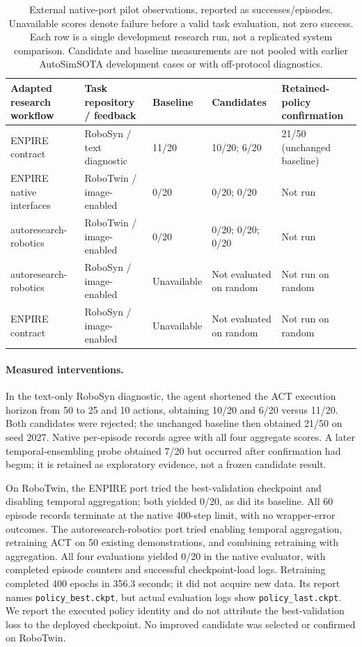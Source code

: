 \documentclass[10pt,twocolumn,letterpaper]{article}
\begin{document}
\begin{table}[t]
\centering\small
\begin{tabular}{@{}lllll@{}}
\toprule
Adapted research workflow & Task repository / feedback & Baseline & Candidates & Retained-policy confirmation \\
\midrule
ENPIRE contract & RoboSyn / text diagnostic & 11/20 & 10/20; 6/20 & 21/50 (unchanged baseline) \\
ENPIRE native interfaces & RoboTwin / image-enabled & 0/20 & 0/20; 0/20 & Not run \\
autoresearch-robotics & RoboTwin / image-enabled & 0/20 & 0/20; 0/20; 0/20 & Not run \\
autoresearch-robotics & RoboSyn / image-enabled & Unavailable & Not evaluated on random & Not run on random \\
ENPIRE contract & RoboSyn / image-enabled & Unavailable & Not evaluated on random & Not run on random \\
\bottomrule
\end{tabular}
\caption{External native-port pilot observations, reported as successes/episodes.
Unavailable scores denote failure before a valid task evaluation, not zero
success. Each row is a single development research run, not a replicated system
comparison. Candidate and baseline measurements are not pooled with earlier
AutoSimSOTA development cases or with off-protocol diagnostics.}
\label{tab:external-native-pilots}
\end{table}

\paragraph{Measured interventions.}
In the text-only RoboSyn diagnostic, the agent shortened the ACT execution
horizon from 50 to 25 and 10 actions, obtaining 10/20 and 6/20 versus 11/20.
Both candidates were rejected; the unchanged baseline then obtained 21/50 on
seed 2027. Native per-episode records agree with all four aggregate scores.
A later temporal-ensembling probe obtained 7/20 but occurred after confirmation
had begun; it is retained as exploratory evidence, not a frozen candidate result.

On RoboTwin, the ENPIRE port tried the best-validation checkpoint and disabling
temporal aggregation; both yielded 0/20, as did its baseline. All 60 episode
records terminate at the native 400-step limit, with no wrapper-error outcomes.
The autoresearch-robotics port tried enabling temporal aggregation, retraining
ACT on 50 existing demonstrations, and combining retraining with aggregation.
All four evaluations yielded 0/20 in the native evaluator, with completed
episode counters and successful checkpoint-load logs. Retraining completed
400 epochs in 356.3 seconds; it did not acquire new data. Its report names
\texttt{policy\_best.ckpt}, but actual evaluation logs show
\texttt{policy\_last.ckpt}. We report the executed policy identity and do not
attribute the best-validation loss to the deployed checkpoint. No improved
candidate was selected or confirmed on RoboTwin.
\end{document}
